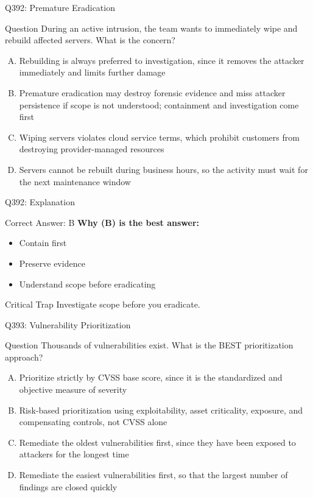 \documentclass{beamer}
\begin{document}
	\begin{frame}{Q392: Premature Eradication}
		\begin{block}{Question}
			\small During an active intrusion, the team wants to immediately wipe and rebuild affected servers. What is the concern?
		\end{block}
		\begin{enumerate}[(A)]
			\footnotesize
			\item Rebuilding is always preferred to investigation, since it removes the attacker immediately and limits further damage
			\item Premature eradication may destroy forensic evidence and miss attacker persistence if scope is not understood; containment and investigation come first
			\item Wiping servers violates cloud service terms, which prohibit customers from destroying provider-managed resources
			\item Servers cannot be rebuilt during business hours, so the activity must wait for the next maintenance window
		\end{enumerate}
	\end{frame}
	
	\begin{frame}{Q392: Explanation}
		\begin{block}{Correct Answer: B}
			\textbf{Why (B) is the best answer:}
			\begin{itemize}
				\item Contain first
				\item Preserve evidence
				\item Understand scope before eradicating
			\end{itemize}
		\end{block}
		\begin{alertblock}{Critical Trap}
			Investigate scope before you eradicate.
		\end{alertblock}
	\end{frame}
	
	\begin{frame}{Q393: Vulnerability Prioritization}
		\begin{block}{Question}
			\small Thousands of vulnerabilities exist. What is the BEST prioritization approach?
		\end{block}
		\begin{enumerate}[(A)]
			\footnotesize
			\item Prioritize strictly by CVSS base score, since it is the standardized and objective measure of severity
			\item Risk-based prioritization using exploitability, asset criticality, exposure, and compensating controls, not CVSS alone
			\item Remediate the oldest vulnerabilities first, since they have been exposed to attackers for the longest time
			\item Remediate the easiest vulnerabilities first, so that the largest number of findings are closed quickly
		\end{enumerate}
	\end{frame}
	
\end{document}
